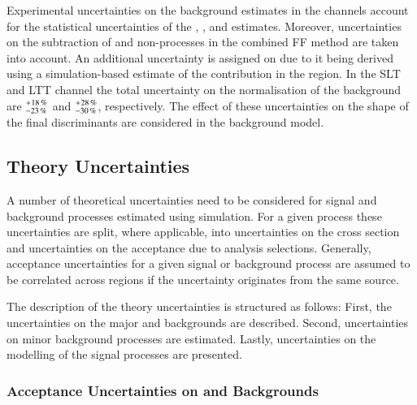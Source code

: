 Experimental uncertainties on the \faketauhadvis background estimates in the
\lephad channels account for the statistical uncertainties of the \FFqcd,
\FFttbar, and \rqcd estimates. Moreover, uncertainties on the subtraction of
\ttbar and non-\ttbar processes in the combined FF method are taken into
account. An additional uncertainty is assigned on \rqcd due to it being derived
using a simulation-based estimate of the \ttbarFakes contribution in the \antiid
region. In the \lephad SLT and LTT channel the total uncertainty on the
normalisation of the \faketauhadvis background are
$^{\hspace{0.25pt}+\hspace{0.25pt}18\,\%}_{-23\,\%}$ and
$^{\hspace{0.25pt}+\hspace{0.25pt}28\,\%}_{-30\,\%}$, respectively. The effect
of these uncertainties on the shape of the final discriminants are considered in
the background model.



\subsection{Theory Uncertainties}%
\label{sec:modelling_uncertainties}%
\label{sec:theory_uncertainties}

A number of theoretical uncertainties need to be considered for signal and
background processes estimated using simulation. For a given process these
uncertainties are split, where applicable, into uncertainties on the cross
section and uncertainties on the acceptance due to analysis
selections. Generally, acceptance uncertainties for a given signal or background
process are assumed to be correlated across regions if the uncertainty
originates from the same source.

The description of the theory uncertainties is structured as follows: First, the
uncertainties on the major \ZHF and \ttbar backgrounds are described. Second,
uncertainties on minor background processes are estimated. Lastly, uncertainties
on the modelling of the signal processes are presented.


\subsubsection{Acceptance Uncertainties on \ZHF and \ttbar Backgrounds}

